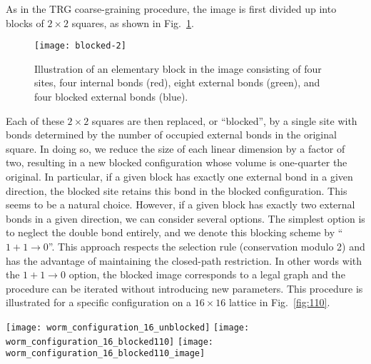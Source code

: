 \documentclass[../main.tex]{subfiles}
\begin{document}
As in the TRG coarse-graining procedure, the image is first divided up into blocks of $2\times2$ squares, as shown in
Fig.~\ref{fig:blocked-2}.
\begin{figure}[htpb]
    \centering
    \texttt{[image: blocked-2]}
    \caption{Illustration of an elementary block in the image consisting of
        four sites, four internal bonds (red), eight external bonds (green), and
    four blocked external bonds (blue).}
    \label{fig:blocked-2}
\end{figure}
Each of these $2\times2$ squares are then replaced, or ``blocked'', by a single site with bonds determined by the
number of occupied external bonds in the original square.  In doing so, we reduce the size of each linear dimension by
a factor of two, resulting in a new blocked configuration whose volume is one-quarter the original. In particular, if a
given block has exactly one external bond in a given direction, the blocked site retains this bond in the blocked
configuration. This seems to be a natural choice. However, if a given block has exactly two external bonds in a given
direction, we can consider several options. The simplest option is to neglect the double bond entirely, and we denote
this blocking scheme by ``$1+1\rightarrow 0$''. This approach respects the selection rule (conservation modulo 2) and
has the advantage of maintaining the closed-path restriction. In other words with the $1+1\rightarrow0$ option, the
blocked image corresponds to a legal graph and the procedure can be iterated without introducing new parameters. This
procedure is illustrated for a specific configuration on a $16\times16$ lattice in Fig.~\ref{fig:110}.
\begin{figure*}[htpb]
    \centering
    \texttt{[image: worm\_configuration\_16\_unblocked]}\hfill%
    \texttt{[image: worm\_configuration\_16\_blocked110]}\hfill%
    \texttt{[image: worm\_configuration\_16\_blocked110\_image]}
    \caption{\label{fig:110}(a) Illustration of the $1+1\rightarrow 0$ blocking
        procedure discussed in the text: original configuration; (b)
        introduction of the blocks and replacement of single or double bounds
        according to the $1+1\rightarrow 0$ rule; (c) construction of the
    corresponding  blocked image.}
\end{figure*}
\end{document}
